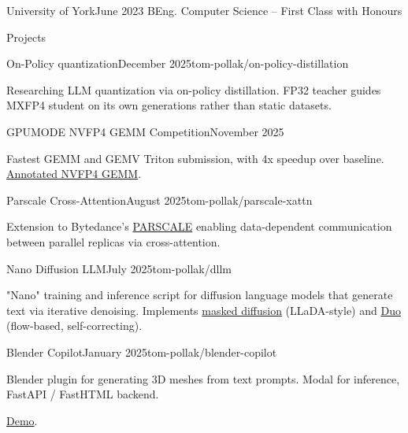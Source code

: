 \documentclass{structure}
\begin{document}
\begin{rSubsectionNoList}{University of York}{June 2023}{
        BEng. Computer Science -- First Class with Honours
    }{}{}
\end{rSubsectionNoList}



\begin{rSection}{Projects}

    \begin{rProject}{On-Policy quantization}{December 2025}{tom-pollak/on-policy-distillation}
        \item Researching LLM quantization via on-policy distillation. FP32 teacher guides MXFP4 student on its own generations rather than static datasets.
    \end{rProject}

    \begin{rProject}{GPUMODE NVFP4 GEMM Competition}{November 2025}{}
        \item Fastest GEMM and GEMV Triton submission, with 4x speedup over baseline. {\color{blue}\href{https://gist.github.com/tom-pollak/5999cc9d09d796f98083e395438e6e99}{Annotated NVFP4 GEMM}}.
    \end{rProject}

    \begin{rProject}{Parscale Cross-Attention}{August 2025}{tom-pollak/parscale-xattn}
        \item Extension to Bytedance's {\color{blue}\href{https://arxiv.org/abs/2505.10475}{PARSCALE}} enabling data-dependent communication between parallel replicas via cross-attention.
    \end{rProject}

    \begin{rProject}{Nano Diffusion LLM}{July 2025}{tom-pollak/dllm}
        \item "Nano" training and inference script for diffusion language models that generate text via iterative denoising. Implements {\color{blue}\href{https://arxiv.org/pdf/2502.09992}{masked diffusion}} (LLaDA-style) and {\color{blue}\href{https://arxiv.org/abs/2506.10892}{Duo}} (flow-based, self-correcting).
    \end{rProject}

    \begin{rProject}{Blender Copilot}{January 2025}{tom-pollak/blender-copilot}
        \item Blender plugin for generating 3D meshes from text prompts. Modal for inference, FastAPI / FastHTML backend.
        \item {\color{blue}\href{https://github.com/tom-pollak/blender-copilot/blob/main/README.md#demo}{Demo}}.
    \end{rProject}


\end{rSection}
\end{document}

